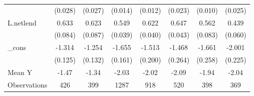 {\begin{tabular}{l*{7}{c}}
            &     (0.028)         &     (0.027)         &     (0.014)         &     (0.012)         &     (0.023)         &     (0.010)         &     (0.025)         \\
\addlinespace
L.netlend   &       0.633\sym{***}&       0.623\sym{***}&       0.549\sym{***}&       0.622\sym{***}&       0.647\sym{***}&       0.562\sym{***}&       0.439\sym{***}\\
            &     (0.084)         &     (0.087)         &     (0.039)         &     (0.040)         &     (0.043)         &     (0.083)         &     (0.060)         \\
\addlinespace
\_cons      &      -1.314\sym{***}&      -1.254\sym{***}&      -1.655\sym{***}&      -1.513\sym{***}&      -1.468\sym{***}&      -1.661\sym{***}&      -2.001\sym{***}\\
            &     (0.125)         &     (0.132)         &     (0.161)         &     (0.200)         &     (0.264)         &     (0.258)         &     (0.225)         \\
\midrule
Mean Y      &       -1.47         &       -1.34         &       -2.03         &       -2.02         &       -2.09         &       -1.94         &       -2.04         \\
Observations&         426         &         399         &        1287         &         918         &         520         &         398         &         369         \\
\bottomrule
\end{tabular}
}
